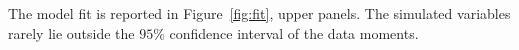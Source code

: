 
The model fit is reported in Figure~\ref{fig:fit}, upper panels. The simulated variables rarely lie outside the $95\%$ confidence interval of the data moments. %


